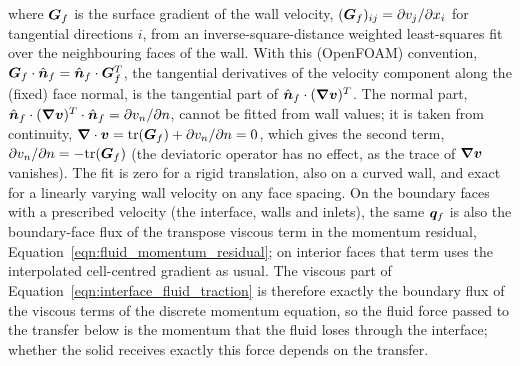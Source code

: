 where $\boldsymbol{G}_f$ is the surface gradient of the wall velocity, $(\boldsymbol{G}_f)_{ij} = \partial v_j/\partial x_i$ for tangential directions $i$, from an inverse-square-distance weighted least-squares fit over the neighbouring faces of the wall.
With this (OpenFOAM) convention, $\boldsymbol{G}_f\cdot\hat{\boldsymbol{n}}_f = \hat{\boldsymbol{n}}_f\cdot\boldsymbol{G}_f^T$, the tangential derivatives of the velocity component along the (fixed) face normal, is the tangential part of $\hat{\boldsymbol{n}}_f\cdot(\boldsymbol{\nabla}\boldsymbol{v})^T$.
The normal part, $\hat{\boldsymbol{n}}_f\cdot(\boldsymbol{\nabla}\boldsymbol{v})^T\cdot\hat{\boldsymbol{n}}_f = \partial v_n/\partial n$, cannot be fitted from wall values; it is taken from continuity, $\boldsymbol{\nabla}\cdot\boldsymbol{v} = \mathrm{tr}(\boldsymbol{G}_f) + \partial v_n/\partial n = 0$, which gives the second term, $\partial v_n/\partial n = -\mathrm{tr}(\boldsymbol{G}_f)$ (the deviatoric operator has no effect, as the trace of $\boldsymbol{\nabla}\boldsymbol{v}$ vanishes).
The fit is zero for a rigid translation, also on a curved wall, and exact for a linearly varying wall velocity on any face spacing.
On the boundary faces with a prescribed velocity (the interface, walls and inlets), the same $\boldsymbol{q}_f$ is also the boundary-face flux of the transpose viscous term in the momentum residual, Equation~\eqref{eqn:fluid_momentum_residual}; on interior faces that term uses the interpolated cell-centred gradient as usual.
The viscous part of Equation~\eqref{eqn:interface_fluid_traction} is therefore exactly the boundary flux of the viscous terms of the discrete momentum equation, so the fluid force passed to the transfer below is the momentum that the fluid loses through the interface; whether the solid receives exactly this force depends on the transfer.

